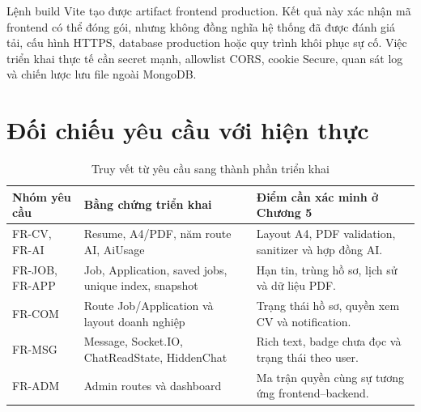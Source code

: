 Lệnh build Vite tạo được artifact frontend production. Kết quả này xác nhận mã frontend có thể đóng gói, nhưng không đồng nghĩa hệ thống đã được đánh giá tải, cấu hình HTTPS, database production hoặc quy trình khôi phục sự cố. Việc triển khai thực tế cần secret mạnh, allowlist CORS, cookie Secure, quan sát log và chiến lược lưu file ngoài MongoDB.

\section{Đối chiếu yêu cầu với hiện thực}

\begin{table}[H]
    \centering
    \small
    \begin{tabularx}{\textwidth}{|p{}|p{}|Y|} \hline
        \textbf{Nhóm yêu cầu} & \textbf{Bằng chứng triển khai} & \textbf{Điểm cần xác minh ở Chương 5} \\ \hline
        FR-CV, FR-AI & Resume, A4/PDF, năm route AI, AiUsage & Layout A4, PDF validation, sanitizer và hợp đồng AI. \\ \hline
        FR-JOB, FR-APP & Job, Application, saved jobs, unique index, snapshot & Hạn tin, trùng hồ sơ, lịch sử và dữ liệu PDF. \\ \hline
        FR-COM & Route Job/Application và layout doanh nghiệp & Trạng thái hồ sơ, quyền xem CV và notification. \\ \hline
        FR-MSG & Message, Socket.IO, ChatReadState, HiddenChat & Rich text, badge chưa đọc và trạng thái theo user. \\ \hline
        FR-ADM & Admin routes và dashboard & Ma trận quyền cùng sự tương ứng frontend--backend. \\ \hline
    \end{tabularx}
    \caption{Truy vết từ yêu cầu sang thành phần triển khai}
    \label{tab:implementation-traceability}
\end{table}
